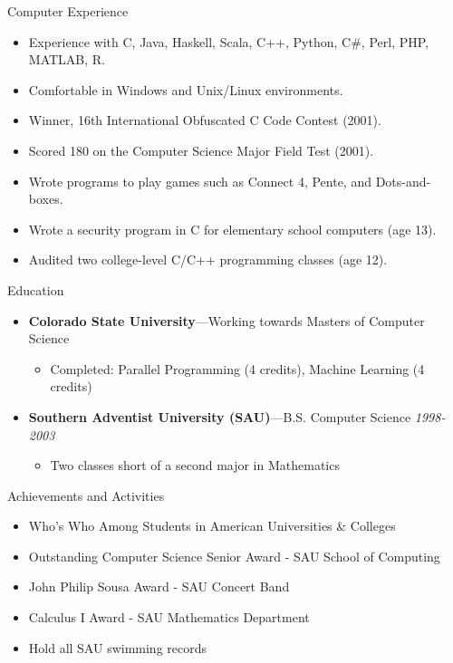 \documentclass[11pt,oneside]{article}
\newenvironment{ressection}[1]{
	\vspace{4pt}
	{\fontfamily{phv}\selectfont\Large#1}
	\begin{itemize}
	\vspace{3pt}
}{
	\end{itemize}
}
\newcommand{\resitem}[1]{
	\vspace{-4pt}
	\item \begin{flushleft} #1 \end{flushleft}
}
\newcommand{\ressubitem}[1]{
	\vspace{-1pt}
	\item \begin{flushleft} #1 \end{flushleft}
}
\newcommand{\resbigitem}[3]{
	\vspace{-5pt}
	\item
	{\textbf{#1}---#2 \hfill \textit{#3}}
}
\newenvironment{restitledposition}[3]{
	\resbigitem{#1}{#2}{#3}
	\vspace{-2pt}
	\begin{itemize}
}{
	\end{itemize}
}
\begin{document}
\begin{ressection}{Computer Experience}

  \resitem{Experience with C, Java, Haskell, Scala, C++, Python, C\#, Perl, PHP, MATLAB, R.}
  \resitem{Comfortable in Windows and Unix/Linux environments.}
  \resitem{Winner, 16th International Obfuscated C Code Contest (2001).}
  \resitem{Scored 180 on the Computer Science Major Field Test (2001).}
  \resitem{Wrote programs to play games such as Connect 4, Pente, and Dots-and-boxes.}
  \resitem{Wrote a security program in C for elementary school computers (age 13).}
  \resitem{Audited two college-level C/C++ programming classes (age 12).}

\end{ressection}


\begin{ressection}{Education}

	\begin{restitledposition}{Colorado State University}{Working towards Masters of Computer Science}{}
		\ressubitem{Completed: Parallel Programming (4 credits), Machine Learning (4 credits)}
	\end{restitledposition}

	\begin{restitledposition}{Southern Adventist University (SAU)}{B.S. Computer Science}{1998-2003}
    \ressubitem{Two classes short of a second major in Mathematics}
	\end{restitledposition}

\end{ressection}


\begin{ressection}{Achievements and Activities}

  \resitem{Who's Who Among Students in American Universities \& Colleges}
	\resitem{Outstanding Computer Science Senior Award - SAU School of Computing}
  \resitem{John Philip Sousa Award - SAU Concert Band}
  \resitem{Calculus I Award - SAU Mathematics Department}
  \resitem{Hold all SAU swimming records}

\end{ressection}
\end{document}
